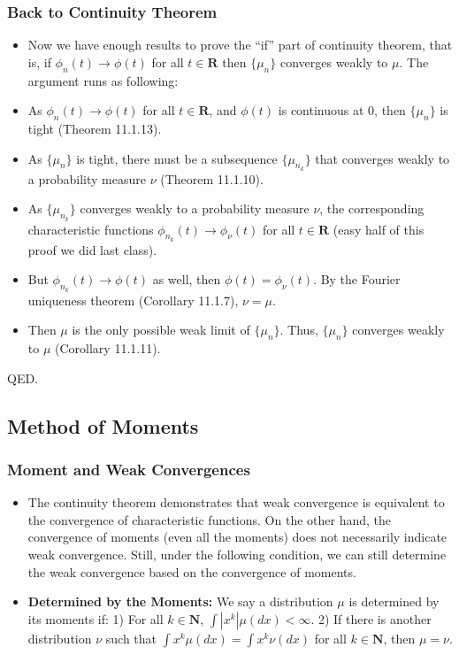 \documentclass[handout]{beamer}
\begin{document}
 
    \frame
{
  \frametitle{Back to Continuity Theorem}

 \begin{itemize}

\item<1-> Now we have enough results to prove the ``if'' part of continuity theorem, that is, if $\phi_n(t)\rightarrow \phi(t)$ for all $t\in \mathbf{R}$ then $\{\mu_n\}$ converges weakly to $\mu$. The argument runs as following:

\item<2-> [(a)] As $\phi_n(t)\rightarrow \phi(t)$ for all $t\in \mathbf{R}$, and $\phi(t)$ is continuous at $0$, then $\{\mu_n\}$ is tight (Theorem 11.1.13).

\item<3->[(b)] As $\{\mu_n\}$ is tight, there must be a subsequence $\{\mu_{n_k}\}$ that converges weakly to a probability measure $\nu$ (Theorem 11.1.10).

\item<4->[(c)] As $\{\mu_{n_k}\}$  converges weakly to a probability measure $\nu$, the corresponding characteristic functions $\phi_{n_k} (t)\rightarrow \phi_{\nu} (t)$ for all $t\in \mathbf{R}$ (easy half of this proof we did last class).

\item<5->[(d)] But $\phi_{n_k} (t)\rightarrow \phi (t)$ as well, then $ \phi (t)= \phi_{\nu} (t)$. By the Fourier uniqueness theorem (Corollary 11.1.7), $\nu=\mu$.

\item<6-> [(e)] Then $\mu$ is the only possible weak limit of $\{\mu_n\}$. Thus, $\{\mu_n\}$ converges weakly to $\mu$ (Corollary 11.1.11). 
\end{itemize}

QED.
 }
 
 \subsection{Method of Moments}
 
 
  
\frame
{
  \frametitle{Moment and Weak Convergences}

 \begin{itemize}

\item<1-> The continuity theorem demonstrates that weak convergence is equivalent to the convergence of characteristic functions. On the other hand, the convergence of moments (even all the moments) does not necessarily indicate weak convergence. Still, under the following condition, we can still determine the weak convergence based on the convergence of moments. 

\item<2-> \textbf{Determined by the Moments:} We say a distribution $\mu$ is determined by its moments if: 1) For all $k\in \mathbf{N}$, $\int |x^k| \mu(dx)<\infty$. 2) If there is another distribution $\nu$ such that $\int x^k \mu(dx)=\int x^k \nu(dx)$ for all $k\in \mathbf{N}$, then $\mu=\nu$.
\end{itemize}
 }
\end{document}
